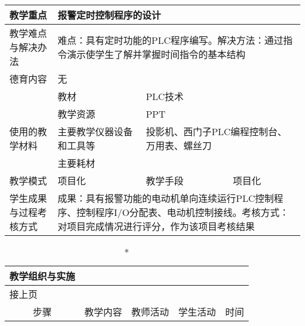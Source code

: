 {\begin{longtable}{|m{20mm}|m{20mm}|m{20mm}|m{20mm}|m{20mm}|m{28mm}|}
\hline
\centering 教学重点 & \multicolumn{5}{m{108mm}|}{报警定时控制程序的设计}\\
\hline
\centering 教学难点与解决办法 &\multicolumn{5}{m{108mm}|}{难点：具有定时功能的PLC程序编写。解决方法：通过指令演示使学生了解并掌握时间指令的基本结构}\\
\hline
\centering 德育内容 &\multicolumn{5}{m{108mm}|}{无}\\
\hline
 &教材 & \multicolumn{4}{l|}{PLC技术}\\
\cline{2-6}& 教学资源 &\multicolumn{4}{m{88mm}|}{PPT}\\
\cline{2-6}\centering 使用的教学材料& 主要教学仪器设备和工具等 &\multicolumn{4}{m{88mm}|}{投影机、西门子PLC编程控制台、万用表、螺丝刀}\\
\cline{2-6}& 主要耗材 &\multicolumn{4}{m{88mm}|}{\qquad}\\
\hline
\centering 教学模式 &\multicolumn{2}{l|}{项目化}&\centering 教学手段 &\multicolumn{2}{l|}{项目化}\\
\hline
\centering 学生成果与过程考核方式 &\multicolumn{5}{m{108mm}|}{成果：具有报警功能的电动机单向连续运行PLC控制程序、控制程序I/O分配表、电动机控制接线。考核方式：对项目完成情况进行评分，作为该项目考核结果}
\end{longtable}
\clearpage


\begin{landscape}
\begin{longtable}{|m{10mm}|m{50mm}|m{50mm}|m{50mm}|m{15mm}|}
\caption*{\huge 教学组织与实施}\\
\hline
\endfirsthead
\multicolumn{5}{l}{\small 接上页}\\
\hline
\multicolumn{1}{|c|}{步骤}&\multicolumn{1}{c|}{教学内容}&\multicolumn{1}{c|}{教师活动}&\multicolumn{1}{c|}{学生活动}&\multicolumn{1}{c|}{时间}\\
\hline
\endhead


\end{longtable}
\end{landscape}}
